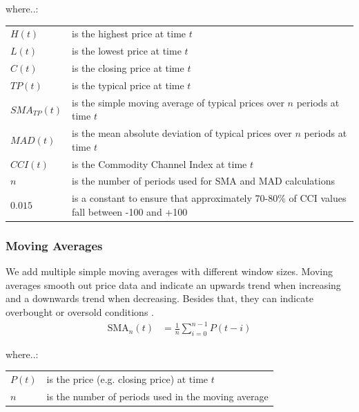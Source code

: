 \documentclass[a4paper,12pt]{report}
\begin{document}
\begin{minipage}{\textwidth}

where..:\\

\begin{tabularx}{\textwidth}{@{}l@{\hspace{2em}--\hspace{2em}}X@{}}
  $H(t)$         & is the highest price at time $t$ \\
  $L(t)$         & is the lowest price at time $t$ \\
  $C(t)$         & is the closing price at time $t$ \\
  $TP(t)$        & is the typical price at time $t$ \\
  $SMA_{TP}(t)$  & is the simple moving average of typical prices over $n$ periods at time $t$ \\
  $MAD(t)$       & is the mean absolute deviation of typical prices over $n$ periods at time $t$ \\
  $CCI(t)$       & is the Commodity Channel Index at time $t$ \\
  $n$            & is the number of periods used for SMA and MAD calculations \\
  $0.015$        & is a constant to ensure that approximately 70-80\% of CCI values fall between -100 and +100 \\
\end{tabularx}

\end{minipage}

			\subsubsection{Moving Averages}
			We add multiple simple moving averages with different window sizes. Moving averages smooth out price data and indicate an upwards trend when increasing and a downwards trend when decreasing. Besides that, they can indicate overbought or oversold conditions \cite{27}. \\
			
			
\[
\begin{aligned}
  \text{SMA}_n(t) &= \frac{1}{n} \sum_{i=0}^{n-1} P(t - i)
\end{aligned}
\]

\begin{minipage}{\textwidth}

where..:\\

\begin{tabularx}{\textwidth}{@{}l@{\hspace{2em}--\hspace{2em}}X@{}}
  $P(t)$ & is the price (e.g. closing price) at time $t$ \\
  $n$    & is the number of periods used in the moving average \\
\end{tabularx}
\end{minipage}
\end{document}
